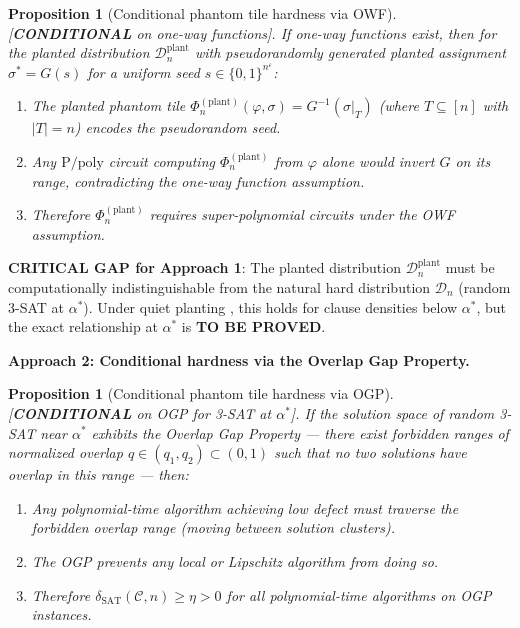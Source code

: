 \documentclass[11pt]{article}
\newtheorem{proposition}[theorem]{Proposition}
\theoremstyle{definition}
\theoremstyle{remark}
\newcommand{\calC}{\mathcal{C}}
\newcommand{\calD}{\mathcal{D}}
\newcommand{\Ppoly}{\mathrm{P/poly}}
\newcommand{\dSAT}{\delta_{\mathrm{SAT}}}
\begin{document}
\begin{proposition}[Conditional phantom tile hardness via OWF]
\label{prop:owf-phantom}
\textup{[\textbf{CONDITIONAL} on one-way functions].}
If one-way functions exist, then for the planted distribution
$\calD_n^{\mathrm{plant}}$ with pseudorandomly generated planted
assignment $\sigma^* = G(s)$ for a uniform seed $s \in \{0,1\}^{n^\varepsilon}$:
\begin{enumerate}[nosep]
  \item The planted phantom tile
    $\Phi_n^{(\mathrm{plant})}(\varphi, \sigma) = G^{-1}(\sigma|_T)$
    (where $T \subseteq [n]$ with $|T| = n$) encodes the pseudorandom seed.
  \item Any $\Ppoly$ circuit computing $\Phi_n^{(\mathrm{plant})}$ from
    $\varphi$ alone would invert $G$ on its range, contradicting the
    one-way function assumption.
  \item Therefore $\Phi_n^{(\mathrm{plant})}$ requires super-polynomial
    circuits under the OWF assumption.
\end{enumerate}
\end{proposition}

\textbf{CRITICAL GAP for Approach 1}: The planted distribution
$\calD_n^{\mathrm{plant}}$ must be computationally indistinguishable from
the natural hard distribution $\calD_n$ (random 3-SAT at $\alpha^*$).
Under quiet planting \cite{planted}, this holds for clause densities
below $\alpha^*$, but the exact relationship at $\alpha^*$ is
\textbf{TO BE PROVED}.

\textbf{Approach 2: Conditional hardness via the Overlap Gap Property.}

\begin{proposition}[Conditional phantom tile hardness via OGP]
\label{prop:ogp-phantom}
\textup{[\textbf{CONDITIONAL} on OGP for 3-SAT at $\alpha^*$].}
If the solution space of random 3-SAT near $\alpha^*$ exhibits the
Overlap Gap Property --- there exist forbidden ranges of normalized
overlap $q \in (q_1, q_2) \subset (0, 1)$ such that no two solutions
have overlap in this range --- then:
\begin{enumerate}[nosep]
  \item Any polynomial-time algorithm achieving low defect must traverse
    the forbidden overlap range (moving between solution clusters).
  \item The OGP prevents any local or Lipschitz algorithm from doing so.
  \item Therefore $\dSAT(\calC, n) \geq \eta > 0$ for all polynomial-time
    algorithms on OGP instances.
\end{enumerate}
\end{proposition}
\end{document}
